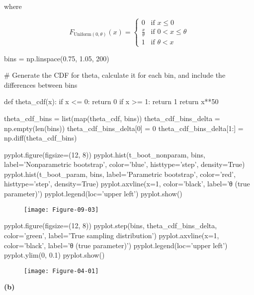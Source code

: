 where

\[F_{\text{Uniform}(0, \theta)}(x) = \begin{cases}
0 & \text{if } x \leq 0 \\
\frac{x}{\theta} & \text{if } 0 < x \leq \theta \\
1 & \text{if } \theta < x
\end{cases}
\]

\begin{python}
bins = np.linspace(0.75, 1.05, 200)
\end{python}

\begin{python}
# Generate the CDF for theta, calculate it for each bin, and include the differences between bins

def theta_cdf(x):
    if x <= 0:
        return 0
    if x >= 1:
        return 1
    return x**50

theta_cdf_bins = list(map(theta_cdf, bins))
theta_cdf_bins_delta = np.empty(len(bins))
theta_cdf_bins_delta[0] = 0
theta_cdf_bins_delta[1:] = np.diff(theta_cdf_bins)
\end{python}

\begin{python}
pyplot.figure(figsize=(12, 8))
pyplot.hist(t_boot_nonparam, bins, label='Nonparametric bootstrap', color='blue', histtype='step', density=True)
pyplot.hist(t_boot_param, bins, label='Parametric bootstrap', color='red', histtype='step', density=True)
pyplot.axvline(x=1, color='black', label='θ (true parameter)')
pyplot.legend(loc='upper left')
pyplot.show()
\end{python}

\begin{figure}[H]
\texttt{[image: Figure-09-03]}
\end{figure}

\begin{python}
pyplot.figure(figsize=(12, 8))
pyplot.step(bins, theta_cdf_bins_delta, color='green', label='True sampling distribution')
pyplot.axvline(x=1, color='black', label='θ (true parameter)')
pyplot.legend(loc='upper left')
pyplot.ylim(0, 0.1)
pyplot.show()
\end{python}

\begin{figure}[H]
\texttt{[image: Figure-04-01]}
\end{figure}

\textbf{(b)}

